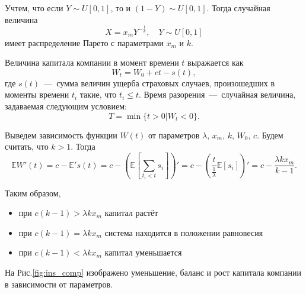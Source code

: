 Учтем, что если \( Y\sim U[0,1] \), то и \( (1-Y)\sim U[0,1] \). Тогда 
 случайная величина
\[
X=x_mY^{-\frac{1}{k}},\quad Y\sim U[0,1]
\]
имеет распределение Парето с параметрами \( x_m \) и \( k \).

Величина капитала компании в момент времени \( t \) выражается как
\[
W_t=W_0+ct-s(t),
\]
где \( s(t) \)~---~сумма величин ущерба страховых случаев, произошедших 
 в моменты времени \( t_i \) такие, что \( t_i\leqslant t \). Время 
 разорения~---~случайная величина, задаваемая следующим условием:
\[
T=\min\lbrace t>0|W_t<0\rbrace.
\]

Выведем зависимость функции \( W(t) \) от параметров \( \lambda \), 
 \( x_m \), \( k \), \( W_0 \), \( c \). Будем считать, что \( k>1 \). 
 Тогда
\[
\mathbb{E}W'(t)=c-\mathbb{E}'s(t)=c-\left(\mathbb{E}\left[\sum\limits_{t_i<t}
 s_i\right]\right)'=c-\left(\dfrac{t}{\frac{1}{\lambda}}\mathbb{E}[s_i]
 \right)'=c-\dfrac{\lambda kx_m}{k-1}.
\]

Таким образом,
\begin{itemize}
	\item при \( c(k-1)>\lambda k x_m \) капитал растёт
	\item при \( c(k-1)=\lambda k x_m \) система находится в положении 
     равновесия
	\item при \( c(k-1)<\lambda k x_m \) капитал уменьшается
\end{itemize}

На Рис.\eqref{fig:ins_comp} изображено уменьшение, баланс и рост капитала
 компании в зависимости от параметров.


